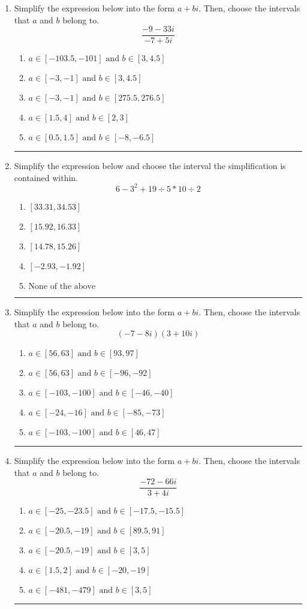 \documentclass[14pt]{extbook}
\newcommand{\litem}[1]{\item#1\hspace*{-1cm}\rule{\textwidth}{0.4pt}}
\begin{document}
\begin{enumerate}
{\begin{enumerate}[label=\Alph*.]
\end{enumerate} }
\litem{
Simplify the expression below into the form $a+bi$. Then, choose the intervals that $a$ and $b$ belong to.\[ \frac{-9 - 33 i}{-7 + 5 i} \]\begin{enumerate}[label=\Alph*.]
\item \( a \in [-103.5, -101] \text{ and } b \in [3, 4.5] \)
\item \( a \in [-3, -1] \text{ and } b \in [3, 4.5] \)
\item \( a \in [-3, -1] \text{ and } b \in [275.5, 276.5] \)
\item \( a \in [1.5, 4] \text{ and } b \in [2, 3] \)
\item \( a \in [0.5, 1.5] \text{ and } b \in [-8, -6.5] \)

\end{enumerate} }
\litem{
Simplify the expression below and choose the interval the simplification is contained within.\[ 6 - 3^2 + 19 \div 5 * 10 \div 2 \]\begin{enumerate}[label=\Alph*.]
\item \( [33.31, 34.53] \)
\item \( [15.92, 16.33] \)
\item \( [14.78, 15.26] \)
\item \( [-2.93, -1.92] \)
\item \( \text{None of the above} \)

\end{enumerate} }
\litem{
Simplify the expression below into the form $a+bi$. Then, choose the intervals that $a$ and $b$ belong to.\[ (-7 - 8 i)(3 + 10 i) \]\begin{enumerate}[label=\Alph*.]
\item \( a \in [56, 63] \text{ and } b \in [93, 97] \)
\item \( a \in [56, 63] \text{ and } b \in [-96, -92] \)
\item \( a \in [-103, -100] \text{ and } b \in [-46, -40] \)
\item \( a \in [-24, -16] \text{ and } b \in [-85, -73] \)
\item \( a \in [-103, -100] \text{ and } b \in [46, 47] \)

\end{enumerate} }
\litem{
Simplify the expression below into the form $a+bi$. Then, choose the intervals that $a$ and $b$ belong to.\[ \frac{-72 - 66 i}{3 + 4 i} \]\begin{enumerate}[label=\Alph*.]
\item \( a \in [-25, -23.5] \text{ and } b \in [-17.5, -15.5] \)
\item \( a \in [-20.5, -19] \text{ and } b \in [89.5, 91] \)
\item \( a \in [-20.5, -19] \text{ and } b \in [3, 5] \)
\item \( a \in [1.5, 2] \text{ and } b \in [-20, -19] \)
\item \( a \in [-481, -479] \text{ and } b \in [3, 5] \)


\end{enumerate}}
\end{enumerate}
\end{document}
